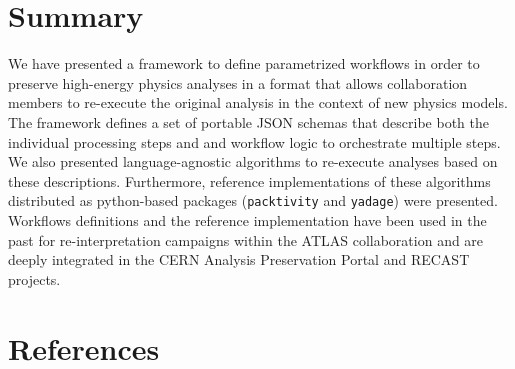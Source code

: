 \documentclass[a4paper]{jpconf}
\begin{document}
\section{Summary}

We have presented a framework to define parametrized workflows in order to preserve high-energy physics analyses in a format that allows collaboration members to re-execute the original analysis in the context of new physics models. The framework defines a set of portable JSON schemas that describe both the individual processing steps and and workflow logic to orchestrate multiple steps. We also presented language-agnostic algorithms to re-execute analyses based on these descriptions. Furthermore, reference implementations of these algorithms distributed as python-based packages (\verb+packtivity+ and \verb+yadage+) were presented. Workflows definitions and the reference implementation have been used in the past for re-interpretation campaigns within the ATLAS collaboration and are deeply integrated in the CERN Analysis Preservation Portal and RECAST projects. 

\section*{References}


\end{document}
